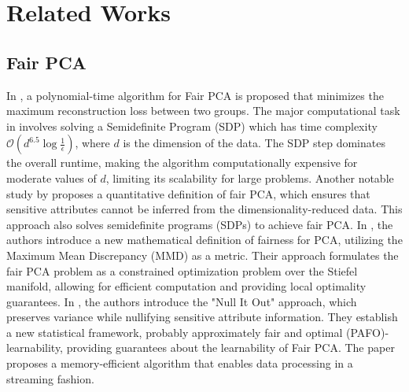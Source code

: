 \section{Related Works}
\subsection{Fair PCA}
In \cite{Samadi2018}, a polynomial-time algorithm for Fair PCA is proposed that minimizes the maximum reconstruction loss between two groups. %
The major computational task in \cite{Samadi2018} involves solving a Semidefinite Program (SDP) which has time complexity \( \mathcal{O}(d^{6.5} \log\frac{1}{\epsilon}) \), where $d$ is the dimension of the data. %
The SDP step dominates the overall runtime, making the algorithm computationally expensive for moderate values of \( d \), limiting its scalability for large problems. %
Another notable study by \cite{Olfat2019} proposes a quantitative definition of fair PCA, which ensures that sensitive attributes cannot be inferred from the dimensionality-reduced data. %
This approach also solves semidefinite programs (SDPs) to achieve fair PCA.%
In \cite{Lee2022}, the authors introduce a new mathematical definition of fairness for PCA, utilizing the Maximum Mean Discrepancy (MMD) as a metric. %
Their approach formulates the fair PCA problem as a constrained optimization problem over the Stiefel manifold, allowing for efficient computation and providing local optimality guarantees. %
In \cite{Lee2024}, the authors introduce the "Null It Out" approach, which preserves variance while nullifying sensitive attribute information. They establish a new statistical framework, probably approximately fair and optimal (PAFO)-learnability, providing guarantees about the learnability of Fair PCA. The paper proposes a memory-efficient algorithm that enables data processing in a streaming fashion. %

